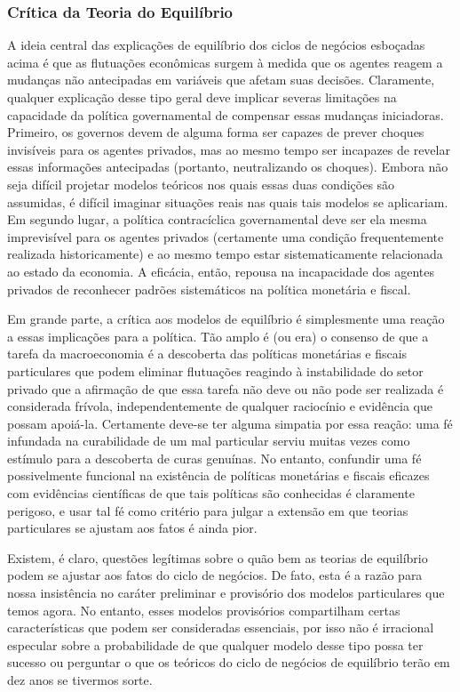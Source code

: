\documentclass[a4paper,12pt]{article}[abntex2]
\begin{document}
\subsubsection{\textbf{Crítica da Teoria do Equilíbrio}}
A ideia central das explicações de equilíbrio dos ciclos de negócios esboçadas acima é que as flutuações econômicas surgem à medida que os agentes reagem a mudanças não antecipadas em variáveis que afetam suas decisões. Claramente, qualquer explicação desse tipo geral deve implicar severas limitações na capacidade da política governamental de compensar essas mudanças iniciadoras. Primeiro, os governos devem de alguma forma ser capazes de prever choques invisíveis para os agentes privados, mas ao mesmo tempo ser incapazes de revelar essas informações antecipadas (portanto, neutralizando os choques). Embora não seja difícil projetar modelos teóricos nos quais essas duas condições são assumidas, é difícil imaginar situações reais nas quais tais modelos se aplicariam. Em segundo lugar, a política contracíclica governamental deve ser ela mesma imprevisível para os agentes privados (certamente uma condição frequentemente realizada historicamente) e ao mesmo tempo estar sistematicamente relacionada ao estado da economia. A eficácia, então, repousa na incapacidade dos agentes privados de reconhecer padrões sistemáticos na política monetária e fiscal.

Em grande parte, a crítica aos modelos de equilíbrio é simplesmente uma reação a essas implicações para a política. Tão amplo é (ou era) o consenso de que a tarefa da macroeconomia é a descoberta das políticas monetárias e fiscais particulares que podem eliminar flutuações reagindo à instabilidade do setor privado que a afirmação de que essa tarefa não deve ou não pode ser realizada é considerada frívola, independentemente de qualquer raciocínio e evidência que possam apoiá-la. Certamente deve-se ter alguma simpatia por essa reação: uma fé infundada na curabilidade de um mal particular serviu muitas vezes como estímulo para a descoberta de curas genuínas. No entanto, confundir uma fé possivelmente funcional na existência de políticas monetárias e fiscais eficazes com evidências científicas de que tais políticas são conhecidas é claramente perigoso, e usar tal fé como critério para julgar a extensão em que teorias particulares se ajustam aos fatos é ainda pior.

Existem, é claro, questões legítimas sobre o quão bem as teorias de equilíbrio podem se ajustar aos fatos do ciclo de negócios. De fato, esta é a razão para nossa insistência no caráter preliminar e provisório dos modelos particulares que temos agora. No entanto, esses modelos provisórios compartilham certas características que podem ser consideradas essenciais, por isso não é irracional especular sobre a probabilidade de que qualquer modelo desse tipo possa ter sucesso ou perguntar o que os teóricos do ciclo de negócios de equilíbrio terão em dez anos se tivermos sorte.
\end{document}
